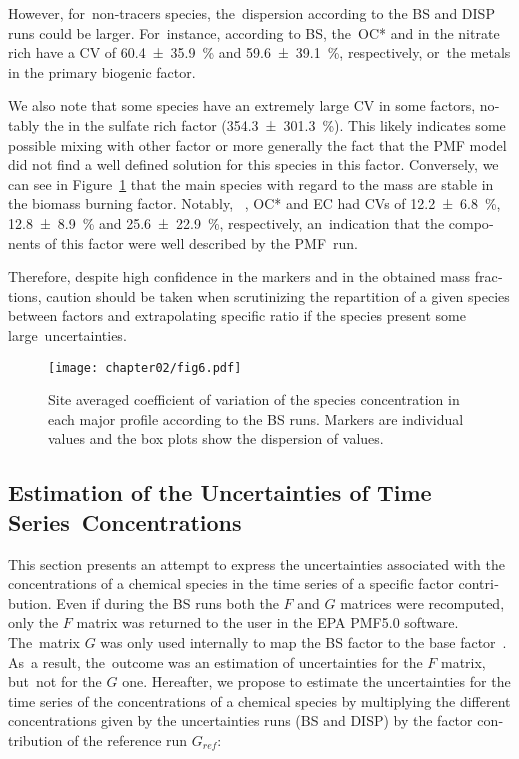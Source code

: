 \begin{otherlanguage}{english}
However, for~non-tracers species, the~dispersion according to the BS and DISP runs could
be larger. For~instance, according to BS, the~OC* and  in the nitrate rich have
a CV of \SI{60.4\pm35.9}{\percent} and \SI{59.6\pm39.1}{\percent}, respectively, or~the
metals in the primary biogenic factor.

We also note that some species have an extremely large CV in some factors, notably the
 in the sulfate rich factor (\SI{354.3\pm301.3}{\percent}). This likely
indicates some possible mixing with other factor or more generally the fact that the PMF
model did not find a well defined solution for this species in this factor. Conversely, we
can see in Figure~\ref{fig:fig6} that the main species with regard to the mass are stable
in the biomass burning factor. Notably,  ~\PM{}, OC* and EC had CVs of
\SI{12.2\pm6.8}{\percent}, \SI{12.8\pm8.9}{\percent} and \SI{25.6\pm22.9}{\percent},
respectively, an~indication that the components of this factor  were well described by the
PMF~run.

Therefore, despite high confidence in the markers and in the obtained mass fractions,
caution should be taken when scrutinizing the repartition of a given species between
factors and extrapolating specific ratio if the species present some large~uncertainties.

\begin{figure}[ht]
    \centering
    \texttt{[image: chapter02/fig6.pdf]}
    \caption{
        Site averaged coefficient of variation of the species concentration in
        each major profile according to the BS runs. Markers are individual
        values and the box plots show  the dispersion of values.
    }
    \label{fig:fig6}
\end{figure}

\subsection{Estimation of the Uncertainties of Time Series~Concentrations}%
\label{sub:estimation_of_the_uncertainties_of_time_series_concentrations}

This section presents an attempt to express the uncertainties associated with the
concentrations of a chemical species in the time series of a specific factor contribution.
Even if during the BS runs both the $F$ and $G$ matrices  were recomputed, only the $F$
matrix was returned to the user in the EPA PMF5.0 software. The~matrix $G$ was only used
internally to map the BS factor to the base factor~\autocite{paateroMethods2014}. As~a
result, the~outcome  was an estimation of uncertainties for the $F$ matrix, but~not for
the $G$ one.  Hereafter, we propose to estimate the uncertainties for the time series of
the concentrations of a chemical species by multiplying the different concentrations given
by the uncertainties runs (BS and DISP) by the factor contribution of the reference run
$G_{ref}$:


\end{otherlanguage}
